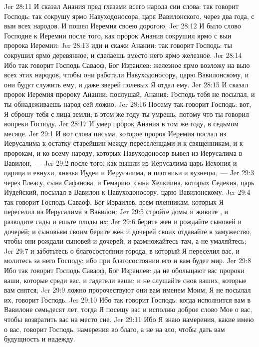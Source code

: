 \vs Jer 28:11 И сказал Анания пред глазами всего народа сии слова: так говорит Господь: так сокрушу ярмо Навуходоносора, царя Вавилонского, через два года,  с выи всех народов. И пошел Иеремия своею дорогою.
\rsbpar\vs Jer 28:12 И было слово Господне к Иеремии после того, как пророк Анания сокрушил ярмо с выи пророка Иеремии:
\vs Jer 28:13 иди и скажи Анании: так говорит Господь: ты сокрушил ярмо деревянное, и сделаешь вместо него ярмо железное.
\vs Jer 28:14 Ибо так говорит Господь Саваоф, Бог Израилев: железное ярмо возложу на выю всех этих народов, чтобы они работали Навуходоносору, царю Вавилонскому, и они будут служить ему, и даже зверей полевых Я отдал ему.
\vs Jer 28:15 И сказал пророк Иеремия пророку Анании: послушай, Анания: Господь тебя не посылал, и ты обнадеживаешь народ сей ложно.
\vs Jer 28:16 Посему так говорит Господь: вот, Я сброшу тебя с лица земли; в этом же году ты умрешь, потому что ты говорил вопреки Господу.
\vs Jer 28:17 И умер пророк Анания в том же году, в седьмом месяце.
\vs Jer 29:1 И вот слова письма, которое пророк Иеремия послал из Иерусалима к остатку старейшин между переселенцами и к священникам, и к пророкам, и ко всему народу, которых Навуходоносор вывел из Иерусалима в Вавилон,~---
\vs Jer 29:2 после того, как вышли из Иерусалима царь Иехония и царица и евнухи, князья Иудеи и Иерусалима, и плотники и кузнецы,~---
\vs Jer 29:3 через Елеасу, сына Сафанова, и Гемарию, сына Хелкиина, которых Седекия, царь Иудейский, посылал в Вавилон к Навуходоносору, царю Вавилонскому:
\vs Jer 29:4 так говорит Господь Саваоф, Бог Израилев, всем пленникам, которых Я переселил из Иерусалима в Вавилон:
\vs Jer 29:5 стройте домы и живите , и разводите сады и ешьте плоды их;
\vs Jer 29:6 берите жен и рождайте сыновей и дочерей; и сыновьям своим берите жен и дочерей своих отдавайте в замужество, чтобы они рождали сыновей и дочерей, и размножайтесь там, а не умаляйтесь;
\vs Jer 29:7 и заботьтесь о благосостоянии города, в который Я переселил вас, и молитесь за него Господу; ибо при благосостоянии его и вам будет мир.
\vs Jer 29:8 Ибо так говорит Господь Саваоф, Бог Израилев: да не обольщают вас пророки ваши, которые среди вас, и гадатели ваши; и не слушайте снов ваших, которые вам снятся;
\vs Jer 29:9 ложно пророчествуют они вам именем Моим; Я не посылал их, говорит Господь.
\vs Jer 29:10 Ибо так говорит Господь: когда исполнится вам в Вавилоне семьдесят лет, тогда Я посещу вас и исполню доброе слово Мое о вас, чтобы возвратить вас на место сие.
\vs Jer 29:11 Ибо  Я знаю намерения, какие имею о вас, говорит Господь, намерения во благо, а не на зло, чтобы дать вам будущность и надежду.
